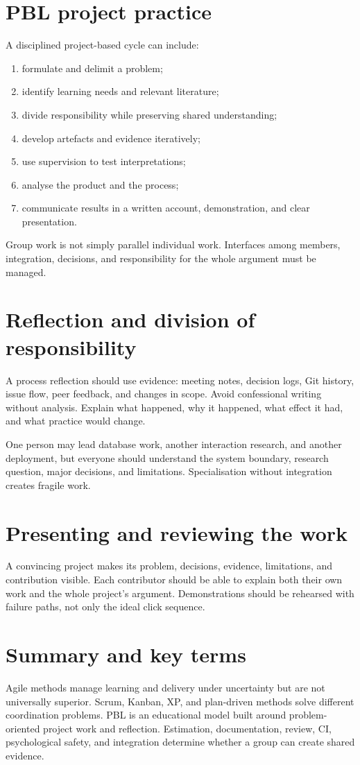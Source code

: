 \section{PBL project practice}
A disciplined project-based cycle can include:
\begin{enumerate}
\item formulate and delimit a problem;
\item identify learning needs and relevant literature;
\item divide responsibility while preserving shared understanding;
\item develop artefacts and evidence iteratively;
\item use supervision to test interpretations;
\item analyse the product and the process;
\item communicate results in a written account, demonstration, and clear presentation.
\end{enumerate}
Group work is not simply parallel individual work. Interfaces among members, integration, decisions, and responsibility for the whole argument must be managed.

\section{Reflection and division of responsibility}
A process reflection should use evidence: meeting notes, decision logs, Git history, issue flow, peer feedback, and changes in scope. Avoid confessional writing without analysis. Explain what happened, why it happened, what effect it had, and what practice would change.

One person may lead database work, another interaction research, and another deployment, but everyone should understand the system boundary, research question, major decisions, and limitations. Specialisation without integration creates fragile work.

\section{Presenting and reviewing the work}
A convincing project makes its problem, decisions, evidence, limitations, and contribution visible. Each contributor should be able to explain both their own work and the whole project's argument. Demonstrations should be rehearsed with failure paths, not only the ideal click sequence.

\section{Summary and key terms}
Agile methods manage learning and delivery under uncertainty but are not universally superior. Scrum, Kanban, XP, and plan-driven methods solve different coordination problems. PBL is an educational model built around problem-oriented project work and reflection. Estimation, documentation, review, CI, psychological safety, and integration determine whether a group can create shared evidence.

